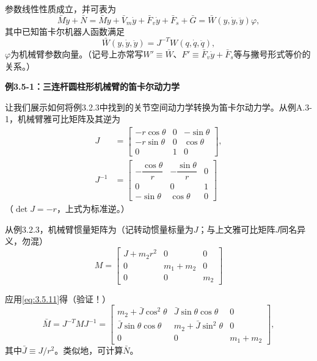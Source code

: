 \documentclass[12pt,a4paper]{ctexart}
\begin{document}
参数线性性质成立，并可表为
\begin{equation}\label{eq:3.5.21}
\bar{M}\ddot{y} + \bar{N} = \bar{M}\ddot{y} + \bar{V}_m\dot{y} + \bar{F}_v\dot{y} + \bar{F}_s + \bar{G} = \bar{W}(y,\dot{y},\ddot{y})\varphi,
\end{equation}
其中已知笛卡尔机器人函数满足
\begin{equation}\label{eq:3.5.22}
\bar{W}(y,\dot{y},\ddot{y}) = J^{-T}W(q,\dot{q},\ddot{q}),
\end{equation}
$\varphi$为机械臂参数向量。（记号上亦常写$W'\equiv\bar{W}$、$F'\equiv \bar{F}_v\dot{y}+\bar{F}_s$等与撇号形式等价的关系。）

\textbf{例3.5-1：三连杆圆柱形机械臂的笛卡尔动力学}

让我们展示如何将例3.2.3中找到的关节空间动力学转换为笛卡尔动力学。从例A.3-1，机械臂雅可比矩阵及其逆为
\begin{align}
J &= \begin{bmatrix} -r\cos\theta & 0 & -\sin\theta \\ -r\sin\theta & 0 & \cos\theta \\ 0 & 1 & 0 \end{bmatrix}, \\
J^{-1} &= \begin{bmatrix} -\dfrac{\cos\theta}{r} & -\dfrac{\sin\theta}{r} & 0 \\[4pt] 0 & 0 & 1 \\ -\sin\theta & \cos\theta & 0 \end{bmatrix}
\end{align}
（$\det J=-r$，上式为标准逆。）

从例3.2.3，机械臂惯量矩阵为（记转动惯量标量为$J$；与上文雅可比矩阵$J$同名异义，勿混）
\begin{equation}
M = \begin{bmatrix} J + m_2 r^2 & 0 & 0 \\ 0 & m_1 + m_2 & 0 \\ 0 & 0 & m_2 \end{bmatrix}
\end{equation}

应用\eqref{eq:3.5.11}得（验证！）
\begin{equation}
\bar{M} = J^{-T} M J^{-1} = \begin{bmatrix}
m_2 + \bar{J}\cos^2\theta & \bar{J}\sin\theta\cos\theta & 0 \\
\bar{J}\sin\theta\cos\theta & m_2 + \bar{J}\sin^2\theta & 0 \\
0 & 0 & m_1+m_2
\end{bmatrix},
\end{equation}
其中$\bar{J}\equiv J/r^2$。类似地，可计算$\bar{N}$。
\end{document}
